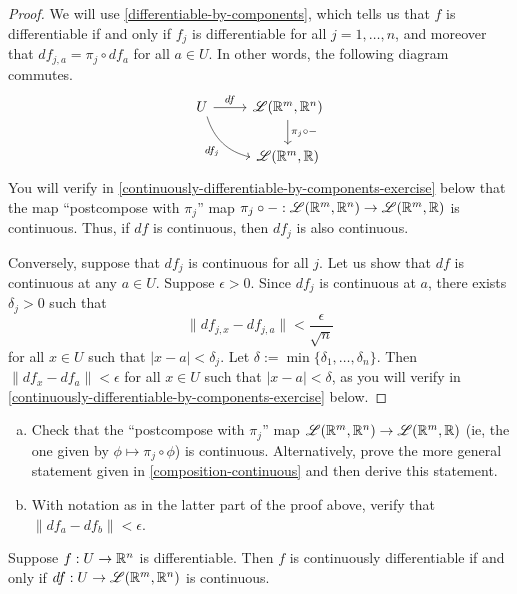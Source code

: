 \begin{proof}
	We will use \cref{differentiable-by-components}, which tells us that $f$ is differentiable if and only if $f_j$ is differentiable for all $j = 1, \dotsc, n$, and moreover that $df_{j,a} = \pi_j \circ df_a$ for all $a \in U$. In other words, the following diagram commutes. 
	\[ \begin{tikzcd} U \ar{r}{df} \ar[bend right]{dr}[swap]{df_j} & \mathscr{L}(\R^m, \R^n) \ar{d}{\pi_j \circ -} \\ & \mathscr{L}(\R^m, \R) \end{tikzcd} \]
	You will verify in \cref{continuously-differentiable-by-components-exercise} below that the map ``postcompose with $\pi_j$'' map $\pi_j \circ - : \mathscr{L}(\mathbb{R}^m, \mathbb{R}^n) \to \mathscr{L}(\mathbb{R}^m, \mathbb{R})$ is continuous. Thus, if $df$ is continuous, then $df_j$ is also continuous. 
	
	Conversely, suppose that $df_j$ is continuous for all $j$. Let us show that $df$ is continuous at any $a \in U$. Suppose $\epsilon > 0$. Since $df_j$ is continuous at $a$, there exists $\delta_j > 0$ such that \[ \|df_{j,x} - df_{j,a}\| < \frac{\epsilon}{\sqrt{n}} \] for all $x \in U$ such that $|x - a| < \delta_j$. Let $\delta := \min\{\delta_1, \dotsc, \delta_n\}$. Then $\|df_x - df_a\| < \epsilon$ for all $x \in U$ such that $|x-a| < \delta$, as you will verify in \cref{continuously-differentiable-by-components-exercise} below. 
\end{proof}

\begin{exercise} \label{continuously-differentiable-by-components-exercise}
	\begin{enumerate}[(a)]
		\item Check that the ``postcompose with $\pi_j$'' map $\mathscr{L}(\mathbb{R}^m, \mathbb{R}^n) \to \mathscr{L}(\mathbb{R}^m, \mathbb{R})$ (ie, the one  given by $\phi \mapsto \pi_j \circ \phi$) is continuous. Alternatively, prove the more general statement given in \cref{composition-continuous} and then derive this statement.   
		\item With notation as in the latter part of the proof above, verify that $\|df_a - df_b\| < \epsilon$. 
	\end{enumerate}
\end{exercise}

\begin{proposition} \label{continuously-differentiable}
	Suppose $f : U \to \mathbb{R}^n$ is differentiable. Then $f$ is continuously differentiable if and only if $df : U \to \mathscr{L}(\mathbb{R}^m, \mathbb{R}^n)$ is continuous. 
\end{proposition}

